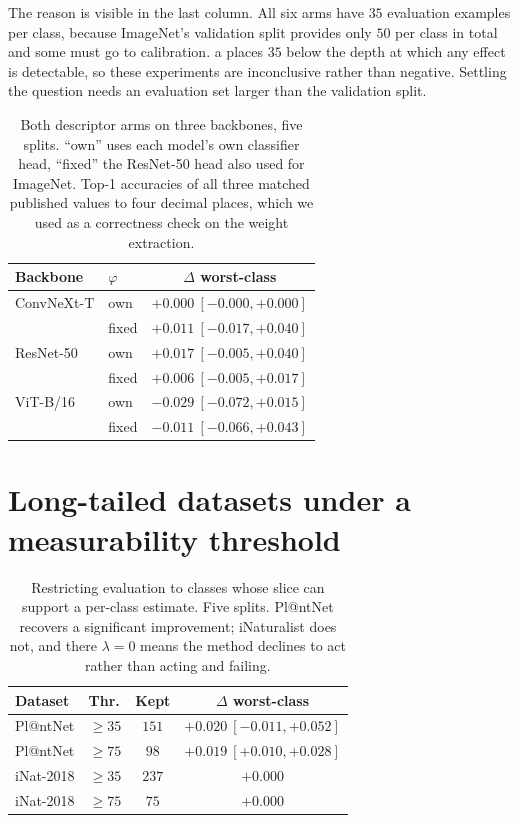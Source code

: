 The reason is visible in the last column. All six arms have $35$ evaluation examples per class,
because ImageNet's validation split provides only $50$ per class in total and some must go to
calibration. a places $35$ below the depth at which any effect is
detectable, so these experiments are inconclusive rather than negative. Settling the question
needs an evaluation set larger than the validation split.

\begin{table}[h]
\centering
\small
\setlength{\tabcolsep}{4pt}
\begin{tabular}{@{}llc@{}}
\toprule
Backbone & $\varphi$ & $\Delta$ worst-class \\
\midrule
ConvNeXt-T \cite{liu2022convnet}     & own   & $+0.000\ [-0.000,+0.000]$ \\
                                     & fixed & $+0.011\ [-0.017,+0.040]$ \\
ResNet-50 \cite{he2016deep}          & own   & $+0.017\ [-0.005,+0.040]$ \\
                                     & fixed & $+0.006\ [-0.005,+0.017]$ \\
ViT-B/16 \cite{dosovitskiy2021image} & own   & $-0.029\ [-0.072,+0.015]$ \\
                                     & fixed & $-0.011\ [-0.066,+0.043]$ \\
\bottomrule
\end{tabular}
\caption{Both descriptor arms on three backbones, five splits. ``own'' uses each model's own
classifier head, ``fixed'' the ResNet-50 head also used for ImageNet. Top-1 accuracies of all
three matched published values to four decimal places, which we used as a correctness check on
the weight extraction.}
\label{tab:backbones}
\end{table}

\section{Long-tailed datasets under a measurability threshold}
\label{app:longtail}

\begin{table}[h]
\centering
\small
\setlength{\tabcolsep}{3pt}
\begin{tabular}{@{}llcc@{}}
\toprule
Dataset & Thr. & Kept & $\Delta$ worst-class \\
\midrule
Pl@ntNet  & $\ge 35$ & $151$ & $+0.020\ [-0.011,+0.052]$ \\
Pl@ntNet  & $\ge 75$ & $98$  & $\mathbf{+0.019}\ [+0.010,+0.028]$ \\
iNat-2018 & $\ge 35$ & $237$ & $+0.000$ \\
iNat-2018 & $\ge 75$ & $75$  & $+0.000$ \\
\bottomrule
\end{tabular}
\caption{Restricting evaluation to classes whose slice can support a per-class estimate. Five
splits. Pl@ntNet recovers a significant improvement; iNaturalist does not, and there
$\lambda=0$ means the method declines to act rather than acting and failing.}
\label{tab:longtail}
\end{table}

